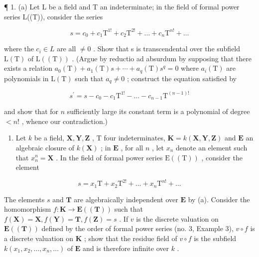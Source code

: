 
¶ 1. (a) Let L be a field and T an indeterminate; in the field of formal power series L((T)), consider the series

\[
s = c _ {0} + c _ {1} \mathrm{T} ^ {1!} + c _ {2} \mathrm{T} ^ {2!} + \dots + c _ {n} \mathrm{T} ^ {n!} + \dots
\]

where the \(c_{i} \in L\) are all \(\neq 0\) . Show that s is transcendental over the subfield \(\mathrm{L}(\mathrm{T})\) of \(\mathrm{L}((\mathrm{T}))\) . (Argue by reductio ad absurdum by supposing that there exists a relation \(a_{0}(\mathrm{T}) + a_{1}(\mathrm{T})s + \cdots + a_{q}(\mathrm{T})s^{q} = 0\) where \(a_{i}(\mathrm{T})\) are polynomials in \(\mathrm{L}(\mathrm{T})\) such that \(a_{q} \neq 0\) ; construct the equation satisfied by

\[
s ^ {\prime} = s - c _ {0} - c _ {1} \mathrm{T} ^ {1!} - \dots - c _ {n - 1} \mathrm{T} ^ {(n - 1)!}
\]

and show that for \(n\) sufficiently large its constant term is a polynomial of degree \(< n!\) , whence our contradiction.)

\begin{enumerate}
\def\labelenumi{(\alph{enumi})}
\setcounter{enumi}{1}
\tightlist
\item
  Let \(k\) be a field, \(\mathbf{X}, \mathbf{Y}, \mathbf{Z}\) , \(\mathrm{T}\) four indeterminates, \(\mathbf{K} = k(\mathbf{X}, \mathbf{Y}, \mathbf{Z})\) and \(\mathbf{E}\) an algebraic closure of \(k(\mathbf{X})\) ; in \(\mathbf{E}\) , for all \(n\) , let \(x_{n}\) denote an element such that \(x_{n}^{n} = \mathbf{X}\) . In the field of formal power series \(\mathrm{E}((\mathrm{T}))\) , consider the element
\end{enumerate}

\[
s = x _ {1} \mathrm{T} + x _ {2} \mathrm{T} ^ {2!} + \dots + x _ {n} \mathrm{T} ^ {n!} + \dots
\]

The elements \(s\) and \(\mathbf{T}\) are algebraically independent over \(\mathbf{E}\) by (a). Consider the homomorphism \(f\colon \mathbf{K} \to \mathbf{E}((\mathbf{T}))\) such that \(f(\mathbf{X}) = \mathbf{X}, f(\mathbf{Y}) = \mathbf{T}, f(\mathbf{Z}) = s\) . If \(v\) is the discrete valuation on \(\mathbf{E}((\mathbf{T}))\) defined by the order of formal power series (no. 3, Example 3), \(v \circ f\) is a discrete valuation on \(\mathbf{K}\) ; show that the residue field of \(v \circ f\) is the subfield \(k(x_1, x_2, \ldots, x_n, \ldots)\) of \(\mathbf{E}\) and is therefore infinite over \(k\) .

